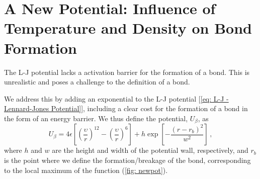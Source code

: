 \documentclass[../../main.tex]{subfiles}
\begin{document}
\section{A New Potential: Influence of Temperature and Density on Bond Formation}

    The L-J potential lacks a activation barrier for the formation of a bond. This is unrealistic and poses a challenge to the definition of a bond. 
    
    We address this by adding an exponential to the L-J potential [\cref{eq: L-J - Lennard-Jones Potential}], including a clear cost for the formation of a bond in the form of an energy barrier. We thus define the potential, $U_\beta$, as
        \begin{equation}\label{eq: L-J - New Potential}
            U_{\beta} = 4\epsilon \left[\left(\frac{\upsilon}{r}\right)^{12} - \left(\frac{\upsilon}{r}\right)^6\right] + h\exp \left[ -\frac{\left(r - r_b\right)^2}{w^2} \right]\,,
        \end{equation}
    where $h$ and $w$ are the height and width of the potential wall, respectively, and $r_b$ is the point where we define the formation/breakage of the bond, corresponding to the local maximum of the function (\cref{fig: newpot}).
    
\end{document}
